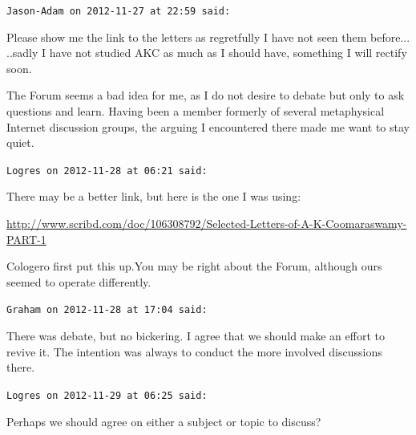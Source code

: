 \begin{footnotesize}
\begin{sffamily}
\hfill

\texttt{Jason-Adam on 2012-11-27 at 22:59 said:}

Please show me the link to the letters as regretfully I have not seen them before... ..sadly I have not studied AKC as much as I should have, something I will rectify soon.

The Forum seems a bad idea for me, as I do not desire to debate but only to ask questions and learn. Having been a member formerly of several metaphysical Internet discussion groups, the arguing I encountered there made me want to stay quiet.

\hfill

\texttt{Logres on 2012-11-28 at 06:21 said:}

There may be a better link, but here is the one I was using:

\url{http://www.scribd.com/doc/106308792/Selected-Letters-of-A-K-Coomaraswamy-PART-1}

Cologero first put this up.You may be right about the Forum, although ours seemed to operate differently.

\hfill

\texttt{Graham on 2012-11-28 at 17:04 said:}

There was debate, but no bickering. I agree that we should make an effort to revive it. The intention was always to conduct the more involved discussions there.

\hfill

\texttt{Logres on 2012-11-29 at 06:25 said:}

Perhaps we should agree on either a subject or topic to discuss?


\hfill

\end{sffamily}
\end{footnotesize}

